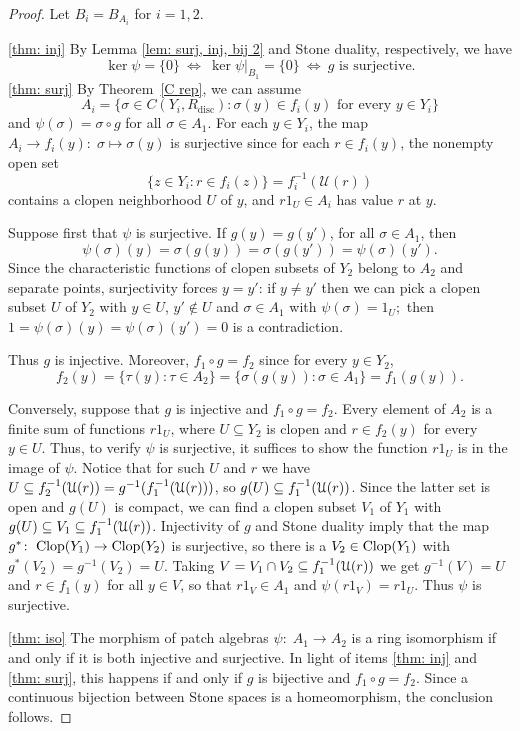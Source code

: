 \documentclass[11pt]{amsart}
\begin{document}
\begin{proof} Let $B_i=B_{A_i}$ for $i=1,2$.

\medskip

  \ref{thm: inj} By Lemma \ref{lem: surj, inj, bij 2} and Stone duality, respectively, we have 
  \[\ker \psi =\{0\} \: \Longleftrightarrow \: \ker \psi|_{B_1} =\{0\} \: \Longleftrightarrow \: g \text{ is surjective.}\]
\ref{thm: surj} By Theorem~\ref{C rep}, we can assume  $$A_i=\{\sigma\in C(Y_i,R_{\mathrm{disc}}): \sigma(y)\in f_i(y)\mbox{ for every }y\in Y_i\}$$ and  $\psi(\sigma)=\sigma\circ g$ for all $\sigma \in A_1$.  For each $y\in Y_i$, the map $A_i \rightarrow f_i(y)\colon\; \sigma \mapsto \sigma(y)$  is surjective  since  for each  $r\in f_i(y)$, the nonempty open set
$$\{z\in Y_i:r\in f_i(z)\} 
= f_i^{-1}(\mathcal{U}(r))$$ contains a clopen neighborhood $U$ of $y$, and $r1_U\in A_i$ has value $r$ at $y$.

Suppose first that $\psi$ is surjective. If $g(y)=g(y')$, for all $\sigma \in A_1$, then $$\psi(\sigma)(y) = \sigma(g(y)) = \sigma(g(y')) = \psi(\sigma)(y').$$   Since the characteristic functions of clopen subsets of $Y_2$ belong to $A_2$ and separate points, surjectivity forces $y=y'$: if $y \neq y'$ then we can pick a clopen subset $U$ of $Y_2$ with $y \in U$, $y' \notin U$ and $\sigma \in A_1$ with $\psi(\sigma)= 1_U;$ then
$1=\psi(\sigma)(y) = \psi(\sigma)(y') = 0$ is a contradiction.

Thus $g$ is injective.
Moreover, $f_1\circ g=f_2$ since for every $y\in Y_2$, $$f_2(y) =\{\tau(y):\tau\in A_2\} =\{\sigma(g(y)):\sigma\in A_1\}
=f_1(g(y)).$$
 

Conversely, suppose that $g$ is injective and $f_1\circ g=f_2$.  Every element of $A_2$ is a finite sum of functions $r1_U$, where $U\subseteq Y_2$ is clopen and $r\in f_2(y)$ for every $y\in U$.
Thus, to verify $\psi$ is surjective, it suffices to show the function $r1_U$ is in the image of $\psi$.
Notice that for such $U$ and $r$ we have $U \subseteq f_2^{-1}(\mathcal{U}(r)) = g^{-1}(f_1^{-1}( \cal U(r)))$, so $g(U) \subseteq f^{-1}_1(\cal U (r))$. Since the latter
set is open and $g(U)$ is compact, we can find a clopen subset $V_1$ of $Y_1$ with $g(U) \subseteq V_1 \subseteq f^{-1}_1(\cal U (r))$.
Injectivity of $g$ and Stone duality imply that the map $g^* \colon\; \Clop(Y_1) \to \Clop(Y_2)$ is surjective, so there is a $V_2 \in \Clop(Y_1)$
with $g^*(V_2)=g^{-1}(V_2)=U$. Taking $V = V_1 \cap V_2 \subseteq f^{-1}_1(\cal U (r))$ we get $g^{-1}(V) = U$ and $r \in f_1(y)$ for all $y \in V$, so that $r1_V \in A_1$ and $\psi(r1_V) =r1_U.$ Thus $\psi$ is surjective.


\medskip

\ref{thm: iso} The morphism of patch algebras $\psi\colon\; A_1\to A_2$ is a ring isomorphism if and only if it is both injective and surjective. In light of items \ref{thm: inj} and \ref{thm: surj}, this happens if and only if $g$ is bijective and $f_1 \circ g = f_2$. Since a continuous bijection between Stone spaces is a homeomorphism, the conclusion follows. 
\end{proof}
\end{document}
